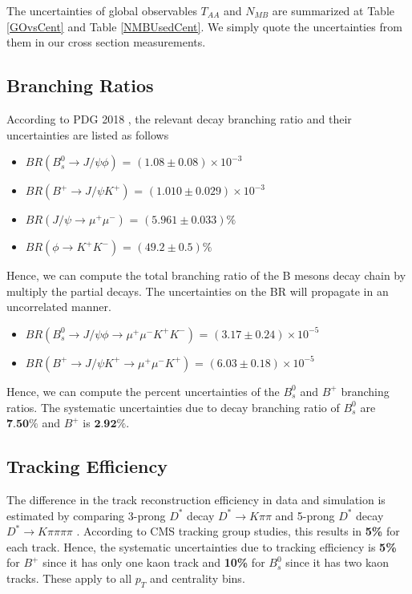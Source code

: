 The uncertainties of global observables $T_{AA}$ and $N_{MB}$ are summarized at Table \ref{GOvsCent} and Table \ref{NMBUsedCent}. We simply quote the uncertainties from them in our cross section measurements. 

\subsection{Branching Ratios}

According to PDG 2018 \cite{PDG2018}, the relevant decay branching ratio and their uncertainties are listed as follows

\begin{itemize}
\item $BR(B^0_s \rightarrow J/\psi \phi)$ = $(1.08 \pm 0.08) \times 10^{-3}$
\item $BR(B^+ \rightarrow J/\psi K^+)$ = $(1.010 \pm 0.029) \times 10^{-3}$
\item $BR(J/\psi \rightarrow \mu^+ \mu^-)$ = $(5.961 \pm 0.033)\%$
\item $BR(\phi \rightarrow K^+ K^-)$ = $(49.2 \pm 0.5)\%$
\end{itemize}

Hence, we can compute the total branching ratio of the B mesons decay chain by multiply the partial decays. The uncertainties on the BR will propagate in an uncorrelated manner.   

\begin{itemize}
\item $BR(B^0_s \rightarrow J/\psi \phi  \rightarrow \mu^+ \mu^- K^+ K^-)$ = $(3.17 \pm 0.24) \times 10^{-5}$
\item $BR(B^+ \rightarrow J/\psi K^+  \rightarrow \mu^+ \mu^- K^+)$ = $(6.03 \pm 0.18) \times 10^{-5}$ 
\end{itemize}

Hence, we can compute the percent uncertainties of the $B^0_s$ and $B^+$ branching ratios. The systematic uncertainties due to decay branching ratio of $B^0_s$ are $\textbf{7.50\%}$ and $B^+$ is  $\textbf{2.92\%}$.

\subsection{Tracking Efficiency}

The difference in the track reconstruction efficiency in data and simulation is estimated by comparing 3-prong $D^{*}$ decay $D^{*} \rightarrow K \pi\pi$ and 5-prong $D^{*}$ decay $D^{*} \rightarrow K \pi\pi\pi\pi$ \cite{TrackEff}. According to CMS tracking group studies, this results in \textbf{5\%} for each track. Hence, the systematic uncertainties due to tracking efficiency is \textbf{5\%} for $B^+$ since it has only one kaon track and \textbf{10\%} for $B^0_s$ since it has two kaon tracks. These apply to all $p_T$ and centrality bins.


